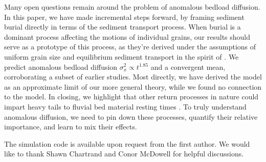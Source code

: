 \documentclass[draft]{agujournal2018}
\begin{document}
Many open questions remain around the problem of anomalous bedload diffusion.
In this paper, we have made incremental steps forward, by framing sediment burial directly in terms of the sediment transport process.
When burial is a dominant process affecting the motions of individual grains, our results should serve as a prototype of this process, as they're derived under the assumptions of uniform grain size and equilibrium sediment transport in the spirit of \citet{Einstein1950}.
We predict anomalous bedload diffusion $\sigma_x^2 \propto t^{1.85}$ and a convergent mean, corroborating a subset of earlier studies.
Most directly, we have derived the \citet{Martin2014} model as an approximate limit of our more general theory, while we found no connection to the \citet{Voepel2013} model.
In closing, we highlight that other return processes in nature could impart heavy tails to fluvial bed material resting times \citep[e.g.][]{Bradley2017}.
To truly understand anomalous diffusion, we need to pin down these processes, quantify their relative importance, and learn to mix their effects.



\acknowledgments
The simulation code is available upon request from the first author. We would like to thank Shawn Chartrand and Conor McDowell for helpful discussions. 


\end{document}
